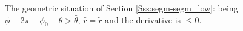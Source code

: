 \documentclass[reqno]{amsart}
\theoremstyle{definition} \newtheorem{definition}{Definition}[section]
\theoremstyle{definition} \newtheorem{remark}[definition]{Remark}
\theoremstyle{plain} \newtheorem{lemma}[definition]{Lemma}
\theoremstyle{plain} \newtheorem{proposition}[definition]{Proposition}
\theoremstyle{plain} \newtheorem{theorem}[definition]{Theorem}
\theoremstyle{plain} \newtheorem{corollary}[definition]{Corollary}
\theoremstyle{definition} \newtheorem{example}[definition]{Example}
\theoremstyle{plain} \newtheorem{claim}[clai]{Claim}
\theoremstyle{definition} \newtheorem{assumption}[definition]{Assumption}
\theoremstyle{definition} \newtheorem{observation}[definition]{Observation}
\newcommand{\1}{\mathbbm 1}
\numberwithin{equation}{section} %
\theoremstyle{plain} \newtheorem*{theorem*}{Theorem}
\theoremstyle{plain} \newtheorem{mthm}[maintheorem]{Main Theorem}
\theoremstyle{plain} \newtheorem*{mthm*}{Main Theorem}
\theoremstyle{plain} \newtheorem*{conjecture*}{Conjecture}
\theoremstyle{plain} \newtheorem{conjecture}[definition]{Conjecture}
\theoremstyle{plain} \newtheorem*{problem*}{Problem}
\begin{document}
\begin{figure}
\resizebox{.75\textwidth}{!}{}
\caption{The geometric situation of Section \ref{Sss:segm-segm_low}: being $\bar \phi - 2\pi - \phi_0 - \bar \theta > \hat \theta$, $\hat r = \tilde r$ and the derivative is $\leq 0$.}
\label{Fig:segm_arc_1}
\end{figure}

%
%
%
%
\end{document}
